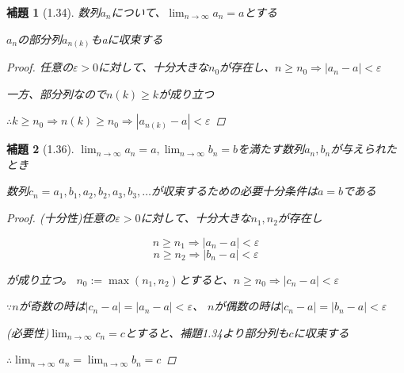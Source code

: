 \documentclass{book}
\newtheorem*{lemma}{補題}
\begin{document}
\begin{lemma}[1.34]
  数列$a_n$について、$\lim_{n \to \infty} a_n = a$とする

  $a_n$の部分列$a_{n(k)}$もaに収束する

  \begin{proof}
    任意の$\varepsilon  > 0$に対して、十分大きな$n_0$が存在し、$n \geq n_0 \Rightarrow |a_n
    - a| < \varepsilon $

    一方、部分列なので$n(k) \geq k$が成り立つ

    $\therefore k \geq n_0 \Rightarrow n(k) \geq n_0 \Rightarrow
    |a_{n(k)} - a| < \varepsilon $
  \end{proof}
\end{lemma}

\begin{lemma}[1.36]
  $\lim_{n \to \infty}a_n = a, \lim_{n \to \infty}b_n = b$を満たす数列$a_n,
  b_n$が与えられたとき

  数列$c_n = a_1,b_1,a_2,b_2,a_3,b_3,\dots$が収束するための必要十分条件は$a = b$である

  \begin{proof}
    (十分性)任意の$\varepsilon > 0$に対して、十分大きな$n_1, n_2$が存在し

    \[n \geq n_1 \Rightarrow |a_n - a| < \varepsilon\]
    \[n \geq n_2 \Rightarrow |b_n - a| < \varepsilon\]

    が成り立つ。
    $n_0 := \max(n_1, n_2)$とすると、$n \geq n_0 \Rightarrow |c_n - a| < \varepsilon$

    $\because n$が奇数の時は$|c_n - a| = |a_n - a| < \varepsilon$、
    $n$が偶数の時は$|c_n - a| = |b_n - a| < \varepsilon$

    (必要性)$\lim_{n \to \infty}c_n = c$とすると、補題1.34より部分列も$c$に収束する

    $\therefore \lim_{n \to \infty}a_n = \lim_{n \to \infty}b_n = c$
  \end{proof}
\end{lemma}
\end{document}
